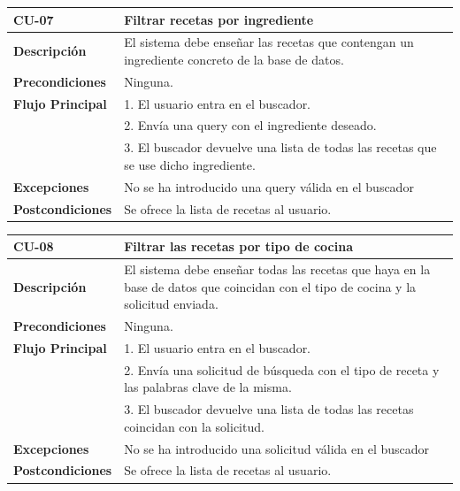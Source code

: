 \begin{table}[H]
\begin{tabular}{|m{3cm}|m{9cm}|}
\hline
\textbf{CU-07} & Filtrar recetas por ingrediente \\
\hline
\textbf{Descripción} & El sistema debe enseñar las recetas que contengan un ingrediente concreto de la base de datos.\\
\hline
\textbf{Precondiciones} & Ninguna. \\
\hline
\textbf{Flujo Principal} & 
1. El usuario entra en el buscador. \\
& 2. Envía una query con el ingrediente deseado. \\
& 3. El buscador devuelve una lista de todas las recetas que se use dicho ingrediente. \\
\hline
\textbf{Excepciones} & No se ha introducido una query válida en el buscador \\
\hline
\textbf{Postcondiciones} & Se ofrece la lista de recetas al usuario.\\
\hline
\end{tabular}
\label{Tab:Cu-07}
\end{table}
\begin{table}[H]
\begin{tabular}{|m{3cm}|m{9cm}|}
\hline
\textbf{CU-08} & Filtrar las recetas por tipo de cocina \\
\hline
\textbf{Descripción} & El sistema debe enseñar todas las recetas que haya en la base de datos que coincidan con el tipo de cocina y la solicitud enviada.\\
\hline
\textbf{Precondiciones} & Ninguna. \\
\hline
\textbf{Flujo Principal} & 
1. El usuario entra en el buscador. \\
& 2. Envía una solicitud de búsqueda con el tipo de receta y las palabras clave de la misma.  \\
& 3. El buscador devuelve una lista de todas las recetas coincidan con la solicitud. \\
\hline
\textbf{Excepciones} & No se ha introducido una solicitud válida en el buscador \\
\hline
\textbf{Postcondiciones} & Se ofrece la lista de recetas al usuario.\\
\hline
\end{tabular}
\label{Tab:Cu-08}
\end{table}

